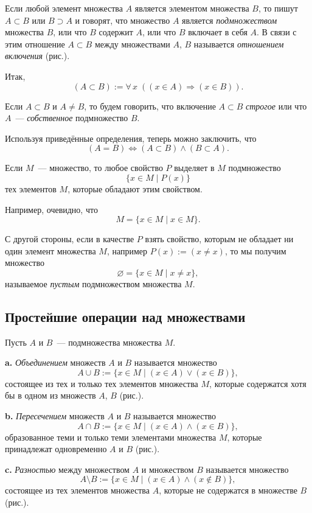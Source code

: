 Если любой элемент множества $A$ является элементом множества $B$, то пишут $A \subset B$ или $B \supset A$ и говорят, что множество $A$ является \emph{подмножеством} множества $B$, или что $B$ содержит $A$, или что $B$ включает в себя $A$. В связи с этим отношение $A \subset B$ между множествами $A$, $B$ называется \emph{отношением включения} (рис.).

Итак,
\[
(A \subset B) := \forall\,x\;((x \in A) \Rightarrow (x \in B)).
\]

Если $A \subset B$ и $A \neq B$, то будем говорить, что включение $A \subset B$ \emph{строгое} или что $A$~--- \emph{собственное} подмножество $B$.

Используя приведённые определения, теперь можно заключить, что
\[
(A = B) \Leftrightarrow (A \subset B) \land (B \subset A).
\]

Если $M$~--- множество, то любое свойство $P$ выделяет в $M$ подмножество
\[
\{x \in M \mid P(x)\}
\]
тех элементов $M$, которые обладают этим свойством.

Например, очевидно, что
\[
M = \{x \in M \mid x \in M\}.
\]

С другой стороны, если в качестве $P$ взять свойство, которым не обладает ни один элемент множества $M$, например $P(x) := (x \neq x)$, то мы получим множество
\[
\varnothing = \{x \in M \mid x \neq x\},
\]
называемое \emph{пустым} подмножеством множества $M$.

\subsection{Простейшие операции над множествами}

Пусть $A$ и $B$~--- подмножества множества $M$.

\textbf{a.} \emph{Объединением} множеств $A$ и $B$ называется множество
\[
A \cup B := \{x \in M \mid (x \in A) \lor (x \in B)\},
\]
состоящее из тех и только тех элементов множества $M$, которые содержатся хотя бы в одном из множеств $A$, $B$ (рис.).

\textbf{b.} \emph{Пересечением} множеств $A$ и $B$ называется множество
\[
A \cap B := \{x \in M \mid (x \in A) \land (x \in B)\},
\]
образованное теми и только теми элементами множества $M$, которые принадлежат одновременно $A$ и $B$ (рис.).

\textbf{c.} \emph{Разностью} между множеством $A$ и множеством $B$ называется множество
\[
A \setminus B := \{x \in M \mid (x \in A) \land (x \notin B)\},
\]
состоящее из тех элементов множества $A$, которые не содержатся в множестве $B$ (рис.).

